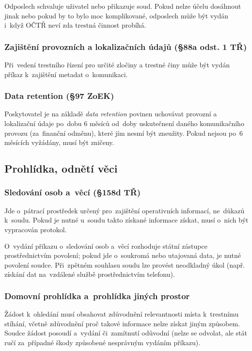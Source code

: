 Odposlech schvaluje uživatel nebo přikazuje soud.
Pokud nelze účelu dosáhnout jinak nebo pokud by to bylo moc komplikované, odposlech může být vydán i~když OČTŘ neví zda trestná činnost probíhá.


\subsubsection{Zajištění provozních a lokalizačních údajů (§88a odst. 1 TŘ)}

Při~vedení trestního řízení pro určité zločiny a trestné činy může být vydán příkaz k~zajištění metadat o~komunikaci.

\subsubsection{Data retention (§97 ZoEK)}

Poskytovatel je na základě \emph{data retention} povinen uchovávat provozní a lokalizační údaje po~dobu 6 měsíců od~doby uskutečnení daného komunikačního provozu (za~finanční odměnu), které jím nesmí být zneužity.
Pokud nejsou po~6 měsících vyžádány, musí být zničeny.


\subsection{Prohlídka, odnětí věci}

\subsubsection{Sledování osob a~věcí (§158d TŘ)}

Jde o~pátrací prostředek určený pro~zajištění operativních informací, ne~důkazů k~soudu.
Pokud je nutné u~soudu takto získané informace získat, musí o~nich být vypracován protokol.

O~vydání příkazu o~sledování osob a~věcí rozhoduje státní zástupce prostřednictvím povolení; pokud jde o~soukromá nebo utajovaná data, je nutné povolení soudce.
Při~zpětném souhlasu soudu lze provést neodkladný úkol (např. získání dat na~vzdálené službě prostřednictvím telefonu).

\subsubsection{Domovní prohlídka a~prohlídka jiných prostor}

Žádost k~ohledání musí obsahovat zdůvodnění relevantnosti místa k~trestnímu stíhání, včetně zdůvodnění proč takové informace nelze získat jiným způsobem.
Soudce žádost posoudí a~vydání či~zamítnutí odůvodní (nelze se odvolat, ale stát ručí za~případné škody způsobené nesprávným vydáním příkazu).

